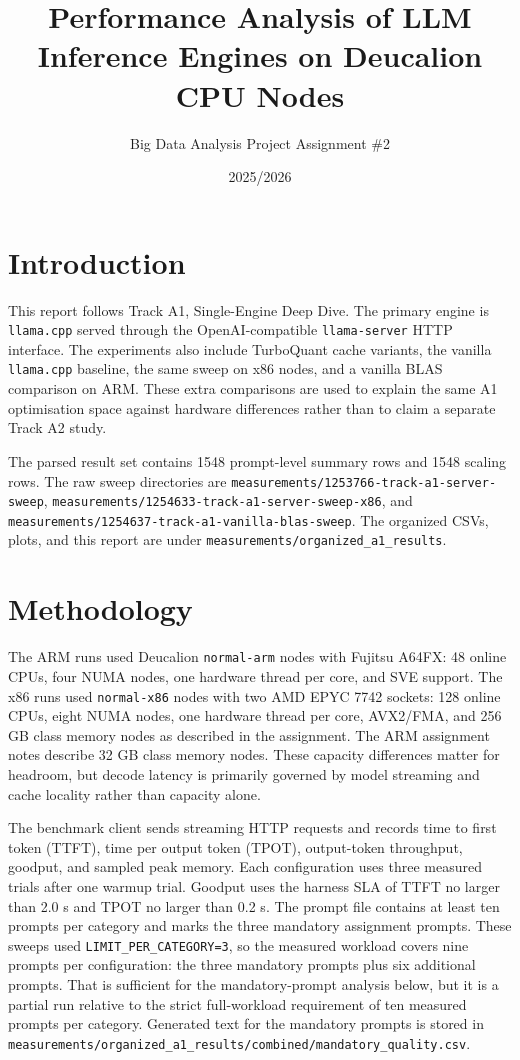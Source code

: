 \documentclass[11pt,a4paper]{article}
\title{Performance Analysis of LLM Inference Engines on Deucalion CPU Nodes}
\author{Big Data Analysis Project Assignment \#2}
\date{2025/2026}
\begin{document}
\maketitle

\section{Introduction}

This report follows Track A1, Single-Engine Deep Dive. The primary engine is
\texttt{llama.cpp} served through the OpenAI-compatible \texttt{llama-server}
HTTP interface. The experiments also include TurboQuant cache variants,
the vanilla \texttt{llama.cpp} baseline, the same sweep on x86 nodes, and a
vanilla BLAS comparison on ARM. These extra comparisons are used to explain
the same A1 optimisation space against hardware differences rather than to
claim a separate Track A2 study.

The parsed result set contains 1548 prompt-level summary rows and 1548 scaling rows.
The raw sweep directories are \texttt{measurements/1253766-track-a1-server-sweep},
\texttt{measurements/1254633-track-a1-server-sweep-x86}, and
\texttt{measurements/1254637-track-a1-vanilla-blas-sweep}. The organized CSVs,
plots, and this report are under \texttt{measurements/organized\_a1\_results}.

\section{Methodology}

The ARM runs used Deucalion \texttt{normal-arm} nodes with Fujitsu A64FX:
48 online CPUs, four NUMA nodes, one hardware thread per core, and SVE support.
The x86 runs used \texttt{normal-x86} nodes with two AMD EPYC 7742 sockets:
128 online CPUs, eight NUMA nodes, one hardware thread per core, AVX2/FMA, and
256 GB class memory nodes as described in the assignment. The ARM assignment
notes describe 32 GB class memory nodes. These capacity differences matter for
headroom, but decode latency is primarily governed by model streaming and cache
locality rather than capacity alone.

The benchmark client sends streaming HTTP requests and records time to first
token (TTFT), time per output token (TPOT), output-token throughput, goodput,
and sampled peak memory. Each configuration uses three measured trials after
one warmup trial. Goodput uses the harness SLA of TTFT no larger than 2.0 s and
TPOT no larger than 0.2 s. The prompt file contains at least ten prompts per category and
marks the three mandatory assignment prompts. These sweeps used
\texttt{LIMIT\_PER\_CATEGORY=3}, so the measured workload covers nine prompts
per configuration: the three mandatory prompts plus six additional prompts.
That is sufficient for the mandatory-prompt analysis below, but it is a partial
run relative to the strict full-workload requirement of ten measured prompts per
category. Generated text for the mandatory prompts is stored in
\texttt{measurements/organized\_a1\_results/combined/mandatory\_quality.csv}.
\end{document}

